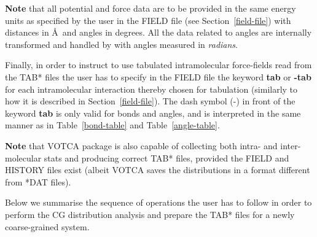 {\bf Note} that all potential and force data are to be provided
in the same energy units as specified by the user in the FIELD
file (see Section~\ref{field-file}) with distances in \AA~and
angles in degrees.  All the data related to angles are internally
transformed and handled by \D with angles measured in {\em radians}.

Finally, in order to instruct \D to use tabulated intramolecular
force-fields read from the TAB* files the user has to specify
in the FIELD file the keyword {\bf tab} or {\bf -tab} for each
intramolecular interaction thereby chosen for tabulation (similarly
to how it is described in Section~\ref{field-file}).
The dash symbol (-) in front of the keyword {\bf tab} is only valid
for bonds and angles, and is interpreted in the same manner as in
Table~\ref{bond-table} and Table~\ref{angle-table}.

{\bf Note} that VOTCA package is also capable of collecting both
intra- and inter-molecular stats and producing correct TAB* files,
provided the FIELD and HISTORY files exist (albeit VOTCA saves
the distributions in a format different from *DAT files).

Below we summarise the sequence of operations the user has to
follow in order to perform the CG distribution analysis and
prepare the TAB* files for a newly coarse-grained system.

